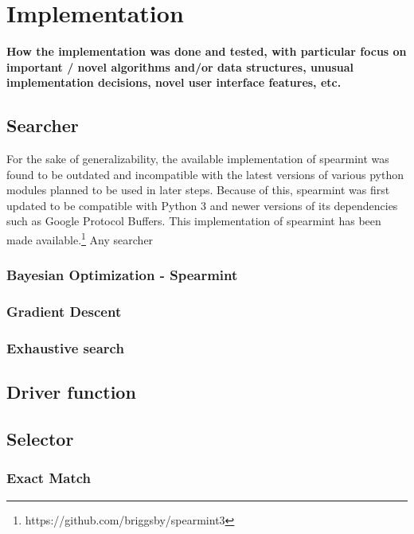 \documentclass{article}
\begin{document}
\section{Implementation}
\textbf{How the implementation was done and tested, with
particular focus on important / novel algorithms and/or
data structures, unusual implementation decisions, novel
user interface features, etc.}
\subsection{Searcher}
For the sake of generalizability, the available implementation of spearmint was found to be outdated and incompatible with the latest versions of various python modules planned to be used in later steps. 
Because of this, spearmint was first updated to be compatible with Python 3 and newer versions of its dependencies such as Google Protocol Buffers. This implementation of spearmint has been made available.\footnote{https://github.com/briggsby/spearmint3}
Any searcher 
\subsubsection{Bayesian Optimization - Spearmint}
\subsubsection{Gradient Descent}
\subsubsection{Exhaustive search}
\subsection{Driver function}

\subsection{Selector}
\subsubsection{Exact Match}
\end{document}

